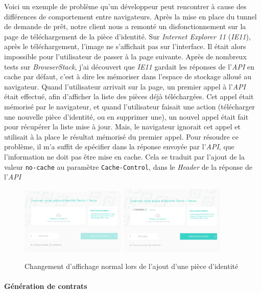 Voici un exemple de problème qu'un développeur peut rencontrer à cause
des différences de comportement entre navigateurs. Après la mise en
place du tunnel de demande de prêt, notre client nous a remonté un
disfonctionnement sur la page de téléchargement de la pièce d'identité.
Sur \emph{Internet Explorer 11} (\emph{IE11}), après le téléchargement,
l'image ne s'affichait pas sur l'interface. Il était alors impossible
pour l'utilisateur de passer à la page suivante. Après de nombreux tests
sur \emph{BrowserStack}, j'ai découvert que \emph{IE11} gardait les
réponses de l'\emph{API} en cache par défaut, c'est à dire les mémoriser
dans l'espace de stockage alloué au navigateur. Quand l'utilisateur
arrivait sur la page, un premier appel à l'\emph{API} était effectué,
afin d'afficher la liste des pièces déjà téléchargées. Cet appel était
mémorisé par le navigateur, et quand l'utilisateur faisait une action
(télécharger une nouvelle pièce d'identité, ou en supprimer une), un
nouvel appel était fait pour récupérer la liste mise à jour. Mais, le
navigateur ignorait cet appel et utilisait à la place le résultat
mémorisé du premier appel. Pour résoudre ce problème, il m'a suffit de
spécifier dans la réponse envoyée par l'\emph{API}, que l'information ne
doit pas être mise en cache. Cela se traduit par l'ajout de la valeur
\texttt{no-cache} au paramètre \texttt{Cache-Control}, dans le
\emph{Header} de la réponse de l'\emph{API}

\bigskip

\begin{figure}[h]
  \centering
  \includegraphics[width=5cm]{figures/finfrog-1.png}
  \includegraphics[width=5cm]{figures/finfrog-2.png}
  \caption{Changement d'affichage normal lors de l'ajout d'une pièce d'identité}
\end{figure}

\paragraph{Génération de contrats}\label{guxe9nuxe9ration-de-contrats}

